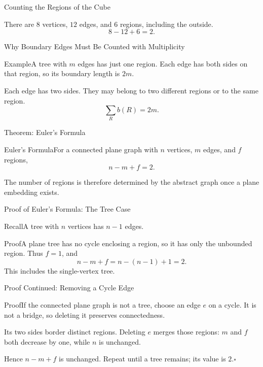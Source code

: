 \documentclass[aspectratio=169,11pt]{beamer}
\newcommand{\Thm}[2]{\begin{block}{#1}#2\end{block}}
\renewcommand{\Proof}[1]{\begin{block}{Proof}\normalsize #1\end{block}}
\renewcommand{\Example}[1]{\begin{block}{Example}#1\end{block}}
\newcommand{\gap}{\par\medskip}
\begin{document}
\begin{frame}{Counting the Regions of the Cube}
\large
\begin{center}\end{center}
There are $8$ vertices, $12$ edges, and $6$ regions, including the outside.
\[8-12+6=2.\]
\end{frame}
\begin{frame}{Why Boundary Edges Must Be Counted with Multiplicity}
\large
\Example{A tree with $m$ edges has just one region. Each edge has both sides on that region, so its boundary length is $2m$.}
\gap Each edge has two sides. They may belong to two different regions or to the same region.
\[\sum_{R} b(R)=2m.\]
\end{frame}
\begin{frame}{Theorem: Euler's Formula}
\large
\Thm{Euler's Formula}{For a connected plane graph with $n$ vertices, $m$ edges, and $f$ regions,\[n-m+f=2.\]}
\gap The number of regions is therefore determined by the abstract graph once a plane embedding exists.
\end{frame}
\begin{frame}{Proof of Euler's Formula: The Tree Case}
\large
\Thm{Recall}{A tree with $n$ vertices has $n-1$ edges.}
\Proof{A plane tree has no cycle enclosing a region, so it has only the unbounded region. Thus $f=1$, and\[n-m+f=n-(n-1)+1=2.\]This includes the single-vertex tree.}
\end{frame}
\begin{frame}{Proof Continued: Removing a Cycle Edge}
\large
\Proof{If the connected plane graph is not a tree, choose an edge $e$ on a cycle. It is not a bridge, so deleting it preserves connectedness.\gap Its two sides border distinct regions. Deleting $e$ merges those regions: $m$ and $f$ both decrease by one, while $n$ is unchanged.\gap Hence $n-m+f$ is unchanged. Repeat until a tree remains; its value is $2$.\hfill$\square$}
\end{frame}
\end{document}

